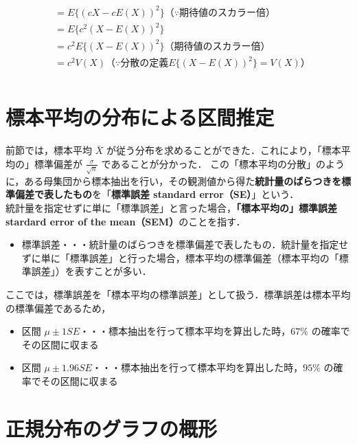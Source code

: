 \begin{itemize}
\begin{eqnarray}
\begin{aligned}
                   & = E\{(cX - cE(X))^2\}（\because 期待値のスカラー倍）                  \\
                   & = E\{c^2(X - E(X))^2\}                                                \\
                   & = c^2 E\{(X - E(X))^2\}（期待値のスカラー倍）                         \\
                   & = c^2 V(X)（\because 分散の定義 E\{(X - E(X))^2\} = V(X)）            \\
          \end{aligned}
        \end{eqnarray}
\end{itemize}

\section{標本平均の分布による区間推定}

前節では，標本平均 $\bar{X}$ が従う分布を求めることができた．これにより，「標本平均の」標準偏差が $\frac{\sigma}{\sqrt{n}}$ であることが分かった．
この「標本平均の分散」のように，ある母集団から標本抽出を行い，その観測値から得た\textbf{統計量のばらつきを標準偏差で表したもの}を「\textbf{標準誤差 standard error（SE）}」という．\\

統計量を指定せずに単に「標準誤差」と言った場合，\textbf{「標本平均の」標準誤差 stardard error of the mean（SEM）}のことを指す．

\begin{itemize}
  \item 標準誤差・・・統計量のばらつきを標準偏差で表したもの．統計量を指定せずに単に「標準誤差」と行った場合，標本平均の標準偏差（標本平均の「標準誤差」）を表すことが多い．
\end{itemize}

ここでは，標準誤差を「標本平均の標準誤差」として扱う．標準誤差は標本平均の標準偏差であるため，

\begin{itemize}
  \item 区間 $\mu \pm 1 SE$・・・標本抽出を行って標本平均を算出した時，$67 \%$ の確率でその区間に収まる
  \item 区間 $\mu \pm 1.96 SE$・・・標本抽出を行って標本平均を算出した時，$95 \%$ の確率でその区間に収まる
\end{itemize}

\newpage

\section{正規分布のグラフの概形}

